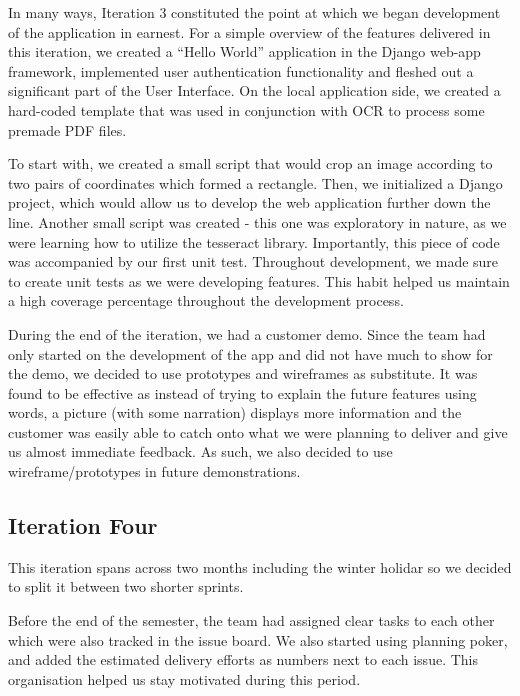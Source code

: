 \documentclass{l3proj}
\begin{document}
In many ways, Iteration 3 constituted the point at which we began development of the application in earnest. For a simple overview of the features delivered in this iteration, we created a ``Hello World'' application in the Django web-app framework, implemented user authentication functionality and fleshed out a significant part of the User Interface. On the local application side, we created a hard-coded template that was used in conjunction with OCR to process some premade PDF files.

To start with, we created a small script that would crop an image according to two pairs of coordinates which formed a rectangle. Then, we initialized a Django project, which would allow us to develop the web application further down the line. Another small script was created - this one was exploratory in nature, as we were learning how to utilize the tesseract library. Importantly, this piece of code was accompanied by our first unit test. Throughout development, we made sure to create unit tests as we were developing features. This habit helped us maintain a high coverage percentage throughout the development process.

During the end of the iteration, we had a customer demo. Since the team had only started on the development of the app and did not have much to show for the demo, we decided to use prototypes and wireframes as substitute. It was found to be effective as instead of trying to explain the future features using words, a picture (with some narration) displays more information and the customer was easily able to catch onto what we were planning to deliver and give us almost immediate feedback. As such, we also decided to use wireframe/prototypes in future demonstrations.


\subsection{Iteration Four}

This iteration spans across two months including the winter holidar so we decided to split it between two shorter sprints. 

Before the end of the semester, the team had assigned clear tasks to each other which were also tracked in the issue board. We also started using planning poker, and added the estimated delivery efforts as numbers next to each issue. This organisation helped us stay motivated during this period. 
\end{document}
